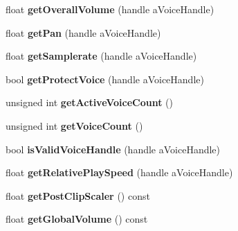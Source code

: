 \begin{DoxyCompactItemize}
\item 
\mbox{\label{class_so_loud_1_1_soloud_ae4d5eb33002809502ecb41fd12e9532d}} 
float {\bfseries get\+Overall\+Volume} (handle a\+Voice\+Handle)
\item 
\mbox{\label{class_so_loud_1_1_soloud_a9da54ea4e9d272f164e3229a30025b1b}} 
float {\bfseries get\+Pan} (handle a\+Voice\+Handle)
\item 
\mbox{\label{class_so_loud_1_1_soloud_a0fb66756e447a46acc4716cb49622d7f}} 
float {\bfseries get\+Samplerate} (handle a\+Voice\+Handle)
\item 
\mbox{\label{class_so_loud_1_1_soloud_a92fede186fb8d7be97be8b8138fa7c2e}} 
bool {\bfseries get\+Protect\+Voice} (handle a\+Voice\+Handle)
\item 
\mbox{\label{class_so_loud_1_1_soloud_a11dc6c58de0c215580afca91d4db4fe6}} 
unsigned int {\bfseries get\+Active\+Voice\+Count} ()
\item 
\mbox{\label{class_so_loud_1_1_soloud_aec874424a3cb96d57b4c00b29c7deec4}} 
unsigned int {\bfseries get\+Voice\+Count} ()
\item 
\mbox{\label{class_so_loud_1_1_soloud_a94e95f482541930fc49aec27f8fc6cc9}} 
bool {\bfseries is\+Valid\+Voice\+Handle} (handle a\+Voice\+Handle)
\item 
\mbox{\label{class_so_loud_1_1_soloud_a648e056e53c2b191394408d61d3c72e4}} 
float {\bfseries get\+Relative\+Play\+Speed} (handle a\+Voice\+Handle)
\item 
\mbox{\label{class_so_loud_1_1_soloud_a5a9ae5c588a41b7c88056ed160969866}} 
float {\bfseries get\+Post\+Clip\+Scaler} () const
\item 
\mbox{\label{class_so_loud_1_1_soloud_ae3d3f2e14082b41d5160c0d291d0bb79}} 
float {\bfseries get\+Global\+Volume} () const
\item 
\mbox{\label{class_so_loud_1_1_soloud_a564c5101270995c1410016b8d53a982a}} 

\end{DoxyCompactItemize}
